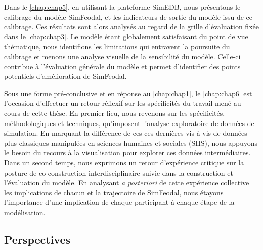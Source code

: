 Dans le \cref{chap:chap5}, en utilisant la plateforme SimEDB, nous présentons le calibrage du modèle SimFeodal, et les indicateurs de sortie du modèle issu de ce calibrage.
Ces résultats sont alors analysés au regard de la grille d'évaluation fixée dans le \cref{chap:chap3}.
Le modèle étant globalement satisfaisant du point de vue thématique, nous identifions les limitations qui entravent la poursuite du calibrage et menons une analyse visuelle de la sensibilité du modèle.
Celle-ci contribue à l'évaluation générale du modèle et permet d'identifier des points potentiels d'amélioration de SimFeodal.

Sous une forme \og pré-conclusive\fg{} et en réponse au \cref{chap:chap1}, le \cref{chap:chap6} est l'occasion d'effectuer un retour réflexif sur les spécificités du travail mené au cours de cette thèse.
En premier lieu, nous revenons sur les spécificités, méthodologiques et techniques, qu'imposent l'analyse exploratoire de données de simulation.
En marquant la différence de ces ces dernières vis-à-vis de données plus classiques manipulées en sciences humaines et sociales (SHS), nous appuyons le besoin du recours à la visualisation pour explorer ces \og données intermédiaires\fg{}.
Dans un second temps, nous exprimons un retour d'expérience critique sur la posture de co-construction interdisciplinaire suivie dans la construction et l'évaluation du modèle.
En analysant \textit{a posteriori} de cette expérience collective les implications de chacun et la trajectoire de SimFeodal, nous étayons l'importance d'une implication de chaque participant à chaque étape de la modélisation.


\subsection*{Perspectives}

